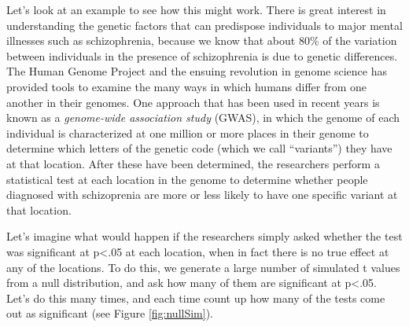 \documentclass[]{book}
\newenvironment{Shaded}{\begin{snugshade}}{\end{snugshade}}
\newcommand{\KeywordTok}[1]{\textcolor[rgb]{0.13,0.29,0.53}{\textbf{#1}}}
\newcommand{\DecValTok}[1]{\textcolor[rgb]{0.00,0.00,0.81}{#1}}
\newcommand{\FloatTok}[1]{\textcolor[rgb]{0.00,0.00,0.81}{#1}}
\newcommand{\StringTok}[1]{\textcolor[rgb]{0.31,0.60,0.02}{#1}}
\newcommand{\CommentTok}[1]{\textcolor[rgb]{0.56,0.35,0.01}{\textit{#1}}}
\newcommand{\OperatorTok}[1]{\textcolor[rgb]{0.81,0.36,0.00}{\textbf{#1}}}
\newcommand{\NormalTok}[1]{#1}
\theoremstyle{definition}
\theoremstyle{definition}
\theoremstyle{definition}
\theoremstyle{remark}
\begin{document}
Let's look at an example to see how this might work. There is great
interest in understanding the genetic factors that can predispose
individuals to major mental illnesses such as schizophrenia, because we
know that about 80\% of the variation between individuals in the
presence of schizophrenia is due to genetic differences. The Human
Genome Project and the ensuing revolution in genome science has provided
tools to examine the many ways in which humans differ from one another
in their genomes. One approach that has been used in recent years is
known as a \emph{genome-wide association study} (GWAS), in which the
genome of each individual is characterized at one million or more places
in their genome to determine which letters of the genetic code (which we
call ``variants'') they have at that location. After these have been
determined, the researchers perform a statistical test at each location
in the genome to determine whether people diagnosed with schizoprenia
are more or less likely to have one specific variant at that location.

Let's imagine what would happen if the researchers simply asked whether
the test was significant at p\textless{}.05 at each location, when in
fact there is no true effect at any of the locations. To do this, we
generate a large number of simulated t values from a null distribution,
and ask how many of them are significant at p\textless{}.05. Let's do
this many times, and each time count up how many of the tests come out
as significant (see Figure \ref{fig:nullSim}).

\begin{Shaded}
\end{Shaded}
\end{document}
